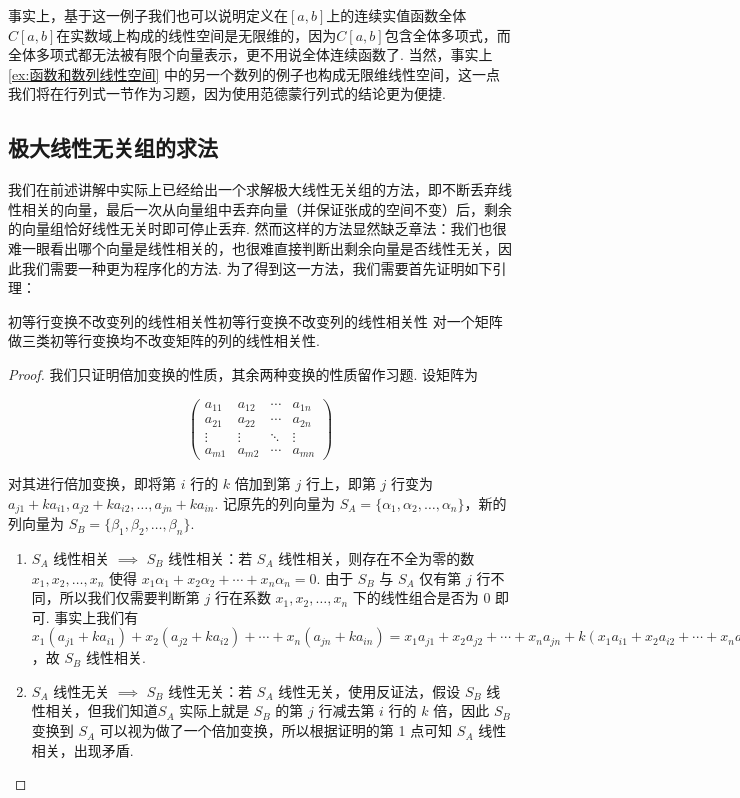 事实上，基于这一例子我们也可以说明定义在$[a,b]$上的连续实值函数全体$C[a,b]$在实数域上构成的线性空间是无限维的，因为$C[a,b]$包含全体多项式，而全体多项式都无法被有限个向量表示，更不用说全体连续函数了. 当然，事实上\autoref{ex:函数和数列线性空间} 中的另一个数列的例子也构成无限维线性空间，这一点我们将在行列式一节作为习题，因为使用范德蒙行列式的结论更为便捷.

\subsection{极大线性无关组的求法}

我们在前述讲解中实际上已经给出一个求解极大线性无关组的方法，即不断丢弃线性相关的向量，最后一次从向量组中丢弃向量（并保证张成的空间不变）后，剩余的向量组恰好线性无关时即可停止丢弃. 然而这样的方法显然缺乏章法：我们也很难一眼看出哪个向量是线性相关的，也很难直接判断出剩余向量是否线性无关，因此我们需要一种更为程序化的方法. 为了得到这一方法，我们需要首先证明如下引理：

\begin{lemma}{初等行变换不改变列的线性相关性}{初等行变换不改变列的线性相关性}
    对一个矩阵做三类初等行变换均不改变矩阵的列的线性相关性.
\end{lemma}

\begin{proof}
    我们只证明倍加变换的性质，其余两种变换的性质留作习题. 设矩阵为

    \[\begin{pmatrix}
            a_{11} & a_{12} & \cdots & a_{1n} \\
            a_{21} & a_{22} & \cdots & a_{2n} \\
            \vdots & \vdots & \ddots & \vdots \\
            a_{m1} & a_{m2} & \cdots & a_{mn}
        \end{pmatrix}\]

    对其进行倍加变换，即将第 $i$ 行的 $k$ 倍加到第 $j$ 行上，即第 $j$ 行变为 $a_{j1} + ka_{i1}, a_{j2} + ka_{i2}, \ldots, a_{jn} + ka_{in}$. 记原先的列向量为 $S_A = \{\alpha_1, \alpha_2, \ldots, \alpha_n\}$，新的列向量为 $S_B = \{\beta_1, \beta_2, \ldots, \beta_n\}$.

    \begin{enumerate}
        \item $S_A$ 线性相关 $\implies$ $S_B$ 线性相关：若 $S_A$ 线性相关，则存在不全为零的数 $x_1, x_2, \ldots, x_n$ 使得 $x_1\alpha_1 + x_2\alpha_2 + \cdots + x_n\alpha_n = 0$. 由于 $S_B$ 与 $S_A$ 仅有第 $j$ 行不同，所以我们仅需要判断第 $j$ 行在系数 $x_1, x_2, \ldots, x_n$ 下的线性组合是否为 0 即可. 事实上我们有 $x_1(a_{j1} + ka_{i1}) + x_2(a_{j2} + ka_{i2}) + \cdots + x_n(a_{jn} + ka_{in}) = x_1a_{j1} + x_2a_{j2} + \cdots + x_na_{jn} + k(x_1a_{i1} + x_2a_{i2} + \cdots + x_na_{in}) = 0$，故 $S_B$ 线性相关.
        \item $S_A$ 线性无关 $\implies$ $S_B$ 线性无关：若 $S_A$ 线性无关，使用反证法，假设 $S_B$ 线性相关，但我们知道$S_A$ 实际上就是 $S_B$ 的第 $j$ 行减去第 $i$ 行的 $k$ 倍，因此 $S_B$ 变换到 $S_A$ 可以视为做了一个倍加变换，所以根据证明的第 1 点可知 $S_A$ 线性相关，出现矛盾.
    \end{enumerate}
\end{proof}

